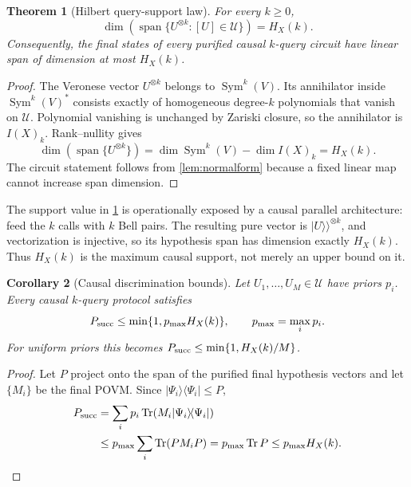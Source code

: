 \documentclass[11pt]{article}
\newtheorem{theorem}{Theorem}[section]
\newtheorem{corollary}[theorem]{Corollary}
\theoremstyle{definition}
\theoremstyle{remark}
\newcommand{\Span}{\operatorname{span}}
\newcommand{\Tr}{\operatorname{Tr}}
\newcommand{\Sym}{\operatorname{Sym}}
\newcommand{\ket}[1]{\lvert #1\rangle}
\newcommand{\bra}[1]{\langle #1\rvert}
\newcommand{\vket}[1]{\lvert #1\rangle\!\rangle}
\begin{document}
\begin{theorem}[Hilbert query-support law]\label{thm:hilbert}
For every $k\geq0$,
\begin{equation}\label{eq:hilbertspan}
 \dim\!\left(\Span\{U^{\otimes k}:[U]\in\mathcal U\}\right)=H_X(k).
\end{equation}
Consequently, the final states of every purified causal $k$-query circuit have
linear span of dimension at most $H_X(k)$.
\end{theorem}

\begin{proof}
The Veronese vector $U^{\otimes k}$ belongs to $\Sym^k(V)$.  Its annihilator
inside $\Sym^k(V)^*$ consists exactly of homogeneous degree-$k$ polynomials
that vanish on $\mathcal U$.  Polynomial vanishing is unchanged by Zariski
closure, so the annihilator is $I(X)_k$.  Rank--nullity gives
\begin{equation}
 \dim\!\left(\Span\{U^{\otimes k}\}\right)
 =\dim\Sym^k(V)-\dim I(X)_k=H_X(k).
\end{equation}
The circuit statement follows from \cref{lem:normalform} because a fixed
linear map cannot increase span dimension.
\end{proof}

The support value in \cref{thm:hilbert} is operationally exposed by a causal
parallel architecture: feed the $k$ calls with $k$ Bell pairs.  The resulting
pure vector is $\vket{U}^{\otimes k}$, and vectorization is injective, so its
hypothesis span has dimension exactly $H_X(k)$.  Thus $H_X(k)$ is the maximum
causal support, not merely an upper bound on it.

\begin{corollary}[Causal discrimination bounds]\label{cor:causalbound}
Let $U_1,\ldots,U_M\in\mathcal U$ have priors $p_i$.  Every causal $k$-query
protocol satisfies
\begin{equation}\label{eq:priorbound}
 P_{\rm succ}\leq
 \min\{1,p_{\max}H_X(k)\},\qquad p_{\max}=\max_i p_i.
\end{equation}
For uniform priors this becomes
$P_{\rm succ}\leq\min\{1,H_X(k)/M\}$.
\end{corollary}

\begin{proof}
Let $P$ project onto the span of the purified final hypothesis vectors and let
$\{M_i\}$ be the final POVM.  Since
$\ket{\Psi_i}\!\bra{\Psi_i}\leq P$,
\begin{align}
 P_{\rm succ}
 &=\sum_i p_i\Tr\!\left(M_i\ket{\Psi_i}\!\bra{\Psi_i}\right)\\
 &\leq p_{\max}\sum_i\Tr(PM_iP)
 =p_{\max}\Tr P\leq p_{\max}H_X(k).
\end{align}
\end{proof}
\end{document}
